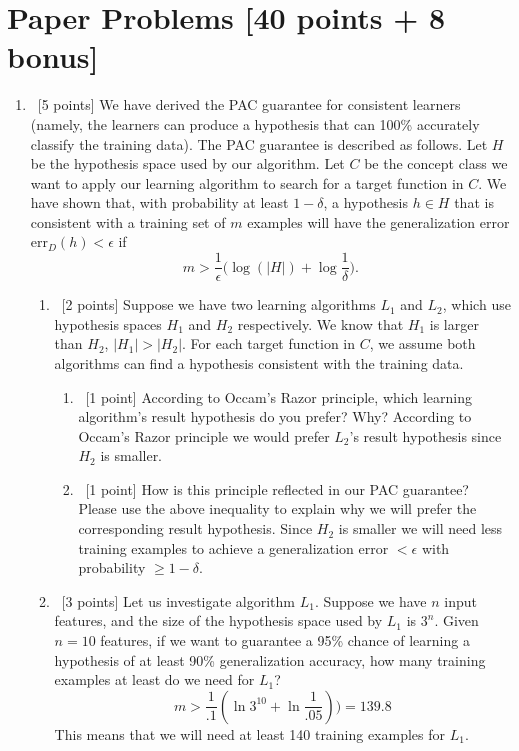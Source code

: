 \documentclass[12pt, fullpage,letterpaper]{article}
\begin{document}
\section{Paper Problems [40 points + 8 bonus]}
\begin{enumerate}
\item~[5 points] We have derived the PAC guarantee for consistent learners (namely, the learners can produce a hypothesis that can 100\% accurately classify the training data). The PAC guarantee is described as follows. Let $H$ be the hypothesis space used by our algorithm. Let $C$ be the concept class we want to apply our learning algorithm to search for a target function in $C$. We have shown that,  with probability at least $1-\delta$, a hypothesis $h\in H$ that is consistent with a training set of $m$ examples will have the generalization error $\mathrm{err}_D(h) < \epsilon$ if 
\[
m > \frac{1}{\epsilon}\big(\log(|H|) + \log\frac{1}{\delta}\big).
\]

\begin{enumerate}
	\item~[2 points] Suppose we have two learning algorithms $L_1$ and $L_2$, which use hypothesis spaces $H_1$ and $H_2$ respectively. We know that $H_1$ is larger than $H_2$, \ie $|H_1| > |H_2|$.
	For each target function in $C$, we assume both algorithms can find a hypothesis consistent with the training data. 
	\begin{enumerate}
		\item~[1 point] According to Occam's Razor principle, which learning algorithm's  result hypothesis do you prefer? Why?\newline\newline
		According to Occam's Razor principle we would prefer $L_2$'s result hypothesis since $H_2$ is smaller.\newline
		\item~[1 point]  How is this principle reflected in our PAC guarantee? Please use the above inequality to explain why we will prefer the corresponding result hypothesis. \newline\newline
		Since $H_2$ is smaller we will need less training examples to achieve a generalization error $< \epsilon$ with probability $\geq 1 - \delta$. \newline
	
	\end{enumerate}
	\item~[3 points] Let us investigate algorithm $L_1$. Suppose we have $n$ input features, and the size of the hypothesis space used by $L_1$ is $3^n$. Given $n=10$ features, if we want to guarantee a 95\% chance of learning a hypothesis of at least 90\% generalization accuracy, how many training examples at least do we need for $L_1$?
	\[m > \frac{1}{.1}(\ln{3^{10}} + \ln{\frac{1}{.05}})) = 139.8\]
	This means that we will need at least 140 training examples for $L_1$.
\end{enumerate}


\end{enumerate}
\end{document}
